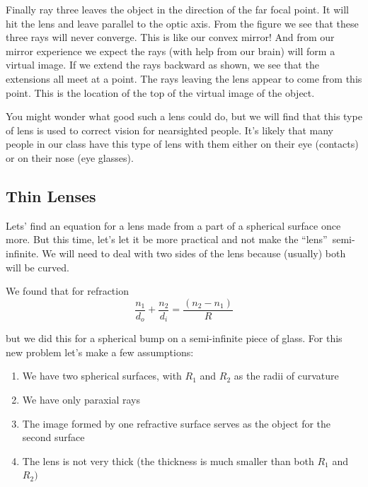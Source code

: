 \documentclass{article}
\begin{document}
Finally ray three leaves the
object in the direction of the far focal point. It will hit the lens and
leave parallel to the optic axis. From the figure we see that these three
rays will never converge. This is like our convex mirror! And from our
mirror experience we expect the rays (with help from our brain) will form a
virtual image. If we extend the rays backward as shown, we see that the
extensions all meet at a point. The rays leaving the lens appear to come
from this point. This is the location of the top of the virtual image of the
object.

You might wonder what good such a lens could do, but we will find that this
type of lens is used to correct vision for nearsighted people. It's likely
that many people in our class have this type of lens with them either on
their eye (contacts) or on their nose (eye glasses).

\subsection{Thin Lenses}

Lets' find an equation for a lens made from a part of a spherical surface
once more. But this time, let's let it be more practical and not make the
\textquotedblleft lens\textquotedblright\ semi-infinite. We will need to
deal with two sides of the lens because (usually) both will be curved.

We found that for refraction%
\[
\frac{n_{1}}{d_{o}}+\frac{n_{2}}{d_{i}}=\frac{\left( n_{2}-n_{1}\right) }{R}
\]

but we did this for a spherical bump on a semi-infinite piece of glass. For
this new problem let's make a few assumptions:

\begin{enumerate}
\item We have two spherical surfaces, with $R_{1}$ and $R_{2}$ as the radii
of curvature

\item We have only paraxial rays

\item The image formed by one refractive surface serves as the object for
the second surface

\item The lens is not very thick (the thickness is much smaller than both $%
R_{1}$ and $R_{2})$
\end{enumerate}
\end{document}

